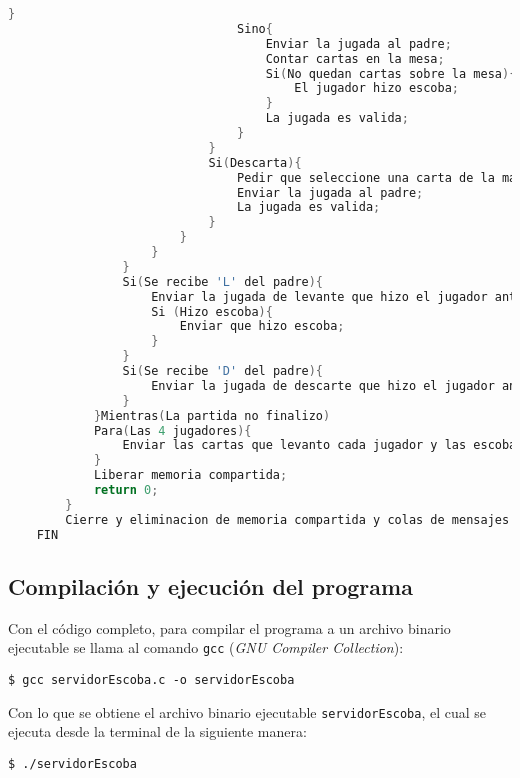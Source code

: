 \begin{lstlisting}[language=C]
                                }
                                Sino{
                                    Enviar la jugada al padre;
                                    Contar cartas en la mesa;
                                    Si(No quedan cartas sobre la mesa){
                                        El jugador hizo escoba;
                                    }
                                    La jugada es valida;
                                }
                            }
                            Si(Descarta){
                                Pedir que seleccione una carta de la mano para descartar;
                                Enviar la jugada al padre;
                                La jugada es valida;
                            }
                        }
                    }
                }
                Si(Se recibe 'L' del padre){
                    Enviar la jugada de levante que hizo el jugador anterior;
                    Si (Hizo escoba){
                        Enviar que hizo escoba;
                    }
                }
                Si(Se recibe 'D' del padre){
                    Enviar la jugada de descarte que hizo el jugador anterior;
                }
            }Mientras(La partida no finalizo)
            Para(Las 4 jugadores){
                Enviar las cartas que levanto cada jugador y las escobas;
            }
            Liberar memoria compartida;
            return 0;
        }
        Cierre y eliminacion de memoria compartida y colas de mensajes
    FIN

\end{lstlisting}

\subsection{Compilación y ejecución del programa}

Con el código completo, para compilar el programa a un archivo binario ejecutable se llama al comando \texttt{gcc} (\textit{GNU Compiler Collection}):

\begin{center}
    \texttt{\$ gcc servidorEscoba.c -o servidorEscoba}\\
\end{center}

Con lo que se obtiene el archivo binario ejecutable \texttt{servidorEscoba}, el cual se ejecuta desde la terminal de la siguiente manera:

\begin{center}
    \texttt{\$ ./servidorEscoba}\\
\end{center}

